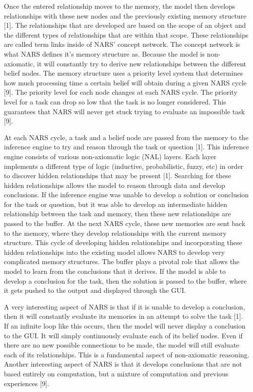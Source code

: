 \documentclass[conference]{IEEEtran}
\begin{document}
	 Once the entered relationship moves to the memory, the model then develops relationships with these new nodes and the previously existing memory structure [1]. The relationships that are developed are based on the scope of an object and the different types of relationships that are within that scope. These relationships are called term links inside of NARS' concept network. The concept network is what NARS defines it's memory structure as. Because the model is non-axiomatic, it will constantly try to derive new relationships between the different belief nodes. The memory structure uses a priority level system that determines how much processing time a certain belief will obtain during a given NARS cycle [9]. The priority level for each node changes at each NARS cycle. The priority level for a task can drop so low that the task is no longer considered. This guarantees that NARS will never get stuck trying to evaluate an impossible task [9].
	 
	 At each NARS cycle, a task and a belief node are passed from the memory to the inference engine to try and reason through the task or question [1]. This inference engine consists of various non-axiomatic logic (NAL) layers. Each layer implements a different type of logic (inductive, probabilistic, fuzzy, etc) in order to discover hidden relationships that may be present [1]. Searching for these hidden relationships allows the model to reason through data and develop conclusions. If the inference engine was unable to develop a solution or conclusion for the task or question, but it was able to develop an intermediate hidden relationship between the task and memory, then these new relationships are passed to the buffer. At the next NARS cycle, these new memories are sent back to the memory, where they develop relationships with the current memory structure. This cycle of developing hidden relationships and incorporating these hidden relationships into the existing model allows NARS to develop very complicated memory structures. The buffer plays a pivotal role that allows the model to learn from the conclusions that it derives. If the model is able to develop a conclusion for the task, then the solution is passed to the buffer, where it gets pushed to the output and displayed through the GUI. 
	 
	 A very interesting aspect of NARS is that if it is unable to develop a conclusion, then it will constantly evaluate its memories in an attempt to solve the task [1]. If an infinite loop like this occurs, then the model will never display a conclusion to the GUI. It will simply continuously evaluate each of its belief nodes. Even if there are no new possible connections to be made, the model will still evaluate each of its relationships. This is a fundamental aspect of non-axiomatic reasoning. Another interesting aspect of NARS is that it develops conclusions that are not based entirely on computation, but a mixture of computation and previous experiences [9].
	 
\end{document}
